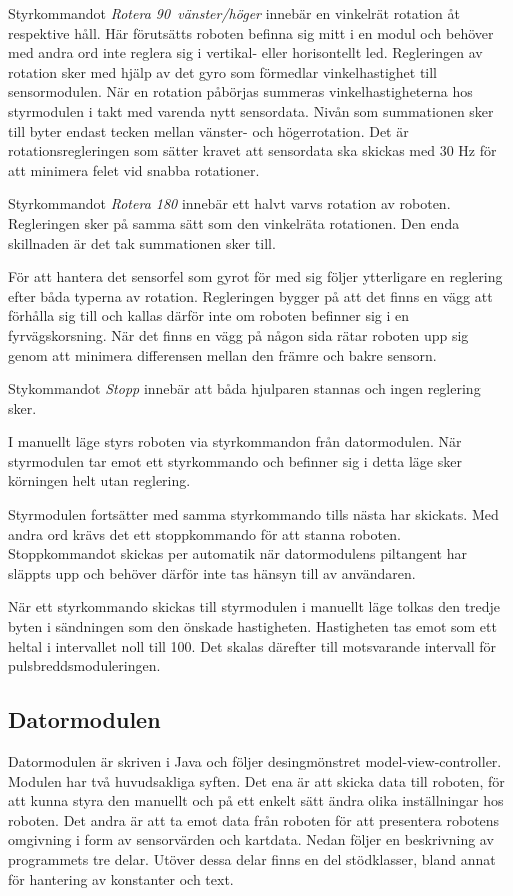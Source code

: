 \documentclass[11pt]{article}
\begin{document}
\begin{flushleft}
\begin{description}[style=unboxed, leftmargin=0cm]
Styrkommandot \textit{Rotera 90\textdegree\ vänster/höger} innebär en vinkelrät rotation åt respektive håll. Här förutsätts roboten befinna sig mitt i en modul och behöver med andra ord inte reglera sig i vertikal- eller horisontellt led. Regleringen av rotation sker med hjälp av det gyro som förmedlar vinkelhastighet till sensormodulen. När en rotation påbörjas summeras vinkelhastigheterna hos styrmodulen i takt med varenda nytt sensordata. Nivån som summationen sker till byter endast tecken mellan vänster- och högerrotation. Det är rotationsregleringen som sätter kravet att sensordata ska skickas med $30$ Hz för att minimera felet vid snabba rotationer. 

Styrkommandot \textit{Rotera 180\textdegree} innebär ett halvt varvs rotation av roboten. Regleringen sker på samma sätt som den vinkelräta rotationen. Den enda skillnaden är det tak summationen sker till. 

För att hantera det sensorfel som gyrot för med sig följer ytterligare en reglering efter båda typerna av rotation. Regleringen bygger på att det finns en vägg att förhålla sig till och kallas därför inte om roboten befinner sig i en fyrvägskorsning. När det finns en vägg på någon sida rätar roboten upp sig genom att minimera differensen mellan den främre och bakre sensorn. 

Stykommandot \textit{Stopp} innebär att båda hjulparen stannas och ingen reglering sker. 

\item[Manuellt läge] I manuellt läge styrs roboten via styrkommandon från datormodulen. När styrmodulen tar emot ett styrkommando och befinner sig i detta läge sker körningen helt utan reglering. 

Styrmodulen fortsätter med samma styrkommando tills nästa har skickats. Med andra ord krävs det ett stoppkommando för att stanna roboten. Stoppkommandot skickas per automatik när datormodulens piltangent har släppts upp och behöver därför inte tas hänsyn till av användaren. 

När ett styrkommando skickas till styrmodulen i manuellt läge tolkas den tredje byten i sändningen som den önskade hastigheten. Hastigheten tas emot som ett heltal i intervallet noll till 100. Det skalas därefter till motsvarande intervall för pulsbreddsmoduleringen.

  \end{description}

\subsection{Datormodulen}
Datormodulen är skriven i Java och följer desingmönstret model-view-controller. Modulen har två huvudsakliga syften. Det ena är att skicka data till roboten, för att kunna styra den manuellt och på ett enkelt sätt ändra olika inställningar hos roboten. Det andra är att ta emot data från roboten för att presentera robotens omgivning i form av sensorvärden och kartdata. Nedan följer en beskrivning av programmets tre delar. Utöver dessa delar finns en del stödklasser, bland annat för hantering av konstanter och text.%


\end{flushleft}
\end{document}
